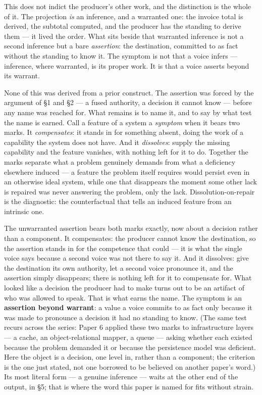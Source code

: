 \documentclass[
]{article}
\begin{document}
This does not indict the producer's other work, and the distinction is
the whole of it. The projection \emph{is} an inference, and a warranted
one: the invoice total is derived, the subtotal computed, and the
producer has the standing to derive them --- it lived the order. What
sits beside that warranted inference is not a second inference but a
bare \emph{assertion}: the destination, committed to as fact without the
standing to know it. The symptom is not that a voice infers ---
inference, where warranted, is its proper work. It is that a voice
asserts beyond its warrant.

None of this was derived from a prior construct. The assertion was
forced by the argument of §1 and §2 --- a fused authority, a decision it
cannot know --- before any name was reached for. What remains is to name
it, and to say by what test the name is earned. Call a feature of a
system a \emph{symptom} when it bears two marks. It \emph{compensates}:
it stands in for something absent, doing the work of a capability the
system does not have. And it \emph{dissolves}: supply the missing
capability and the feature vanishes, with nothing left for it to do.
Together the marks separate what a problem genuinely demands from what a
deficiency elsewhere induced --- a feature the problem itself requires
would persist even in an otherwise ideal system, while one that
disappears the moment some other lack is repaired was never answering
the problem, only the lack. Dissolution-on-repair is the diagnostic: the
counterfactual that tells an induced feature from an intrinsic one.

The unwarranted assertion bears both marks exactly, now about a decision
rather than a component. It compensates: the producer cannot know the
destination, so the assertion stands in for the competence that could
--- it is what the single voice says because a second voice was not
there to say it. And it dissolves: give the destination its own
authority, let a second voice pronounce it, and the assertion simply
disappears; there is nothing left for it to compensate for. What looked
like a decision the producer had to make turns out to be an artifact of
who was allowed to speak. That is what earns the name. The symptom is an
\textbf{assertion beyond warrant}: a value a voice commits to as fact
only because it was made to pronounce a decision it had no standing to
know. (The same test recurs across the series: Paper 6 applied these two
marks to infrastructure layers --- a cache, an object-relational mapper,
a queue --- asking whether each existed because the problem demanded it
or because the persistence model was deficient. Here the object is a
decision, one level in, rather than a component; the criterion is the
one just stated, not one borrowed to be believed on another paper's
word.) Its most literal form --- a genuine inference --- waits at the
other end of the output, in §5; that is where the word this paper is
named for fits without strain.
\end{document}
